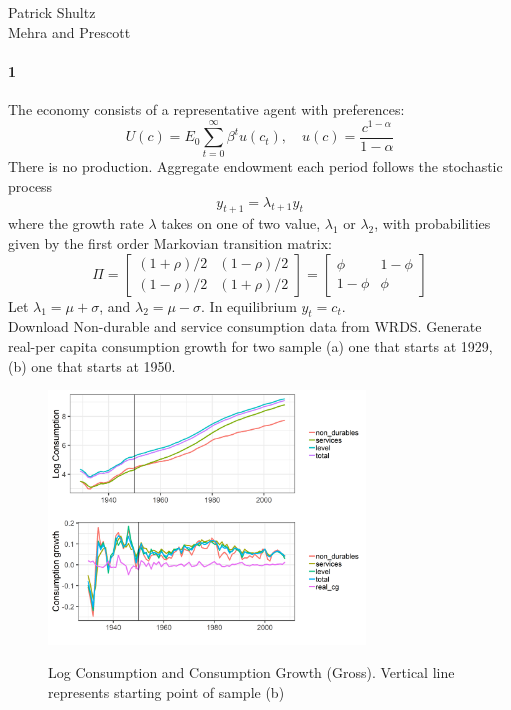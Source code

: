 \documentclass[french]{article}
\begin{document}
\noindent Patrick Shultz\\
Mehra and Prescott

\paragraph{1}
The economy consists of a representative agent with preferences:
\begin{equation*}
	U(c) = E_0 \sum_{t=0}^{\infty}\beta^tu(c_t), \quad u(c) = \frac{c^{1-\alpha}}{1-\alpha}
\end{equation*}
There is no production. Aggregate endowment each period follows the stochastic process
\begin{equation*}
	y_{t+1} = \lambda_{t+1}y_t
\end{equation*}
where the growth rate $\lambda$ takes on one of two value, $\lambda_1$ or $\lambda_2$, with probabilities given by the first order Markovian transition matrix:
\begin{equation*}
	\Pi = \begin{bmatrix} 
	(1+\rho)/2 & (1-\rho)/2\\(1-\rho)/2 & (1+\rho)/2
	\end{bmatrix}
	=\begin{bmatrix} 
	\phi & 1-\phi\\1-\phi & \phi
	\end{bmatrix}
\end{equation*}
Let $\lambda_1=\mu + \sigma$, and $\lambda_2 = \mu-\sigma$. In equilibrium $y_t = c_t$. \\

Download Non-durable and service consumption data from WRDS. Generate real-per capita consumption growth for two sample (a) one that starts at 1929, (b) one that starts at 1950. 

\begin{figure}[!htb]
	\centering
	\includegraphics[width=0.75\textwidth]{connsumption_growth.png}
	\label{fig:consumption_data}
	\caption{Log Consumption and Consumption Growth (Gross). Vertical line represents starting point of sample (b)}
\end{figure}
\end{document}
